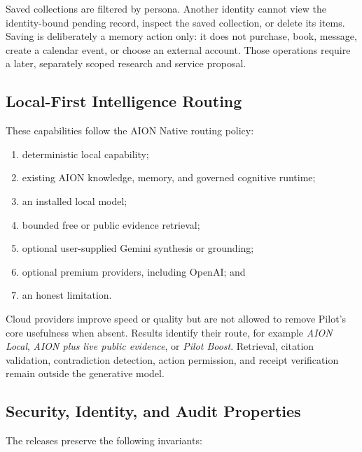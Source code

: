 Saved collections are filtered by persona.  Another identity cannot view the
identity-bound pending record, inspect the saved collection, or delete its
items.  Saving is deliberately a memory action only: it does not purchase,
book, message, create a calendar event, or choose an external account.  Those
operations require a later, separately scoped research and service proposal.

\subsection{Local-First Intelligence Routing}

These capabilities follow the AION Native routing policy:

\begin{enumerate}
    \item deterministic local capability;
    \item existing AION knowledge, memory, and governed cognitive runtime;
    \item an installed local model;
    \item bounded free or public evidence retrieval;
    \item optional user-supplied Gemini synthesis or grounding;
    \item optional premium providers, including OpenAI; and
    \item an honest limitation.
\end{enumerate}

Cloud providers improve speed or quality but are not allowed to remove Pilot's
core usefulness when absent.  Results identify their route, for example
\emph{AION Local}, \emph{AION plus live public evidence}, or \emph{Pilot Boost}.
Retrieval, citation validation, contradiction detection, action permission, and
receipt verification remain outside the generative model.

\subsection{Security, Identity, and Audit Properties}

The releases preserve the following invariants:

